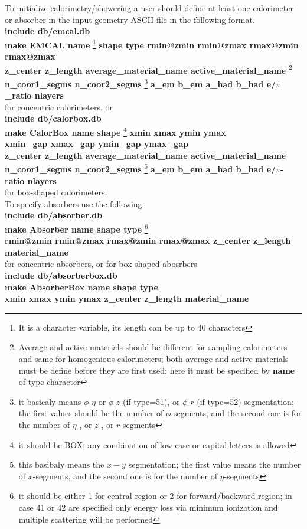 \par
To initialize calorimetry/showering a user should define at least one 
calorimeter or absorber in the input geometry ASCII file in the following 
format. \\
{\bf include db/emcal.db} \\
{\bf make EMCAL name} \footnote{It is a character variable, its length
can be up to 40 characters}
{\bf shape type rmin@zmin rmin@zmax rmax@zmin rmax@zmax} \\
{\bf z\_center z\_length average\_material\_name active\_material\_name} 
\footnote{Average and active materials should be different for sampling
calorimeters and same for homogenious calorimeters; both average and active
materials must be define before they are first used; here it must be 
specified by {\bf name} of type character}  
\\
{\bf n\_coor1\_segms n\_coor2\_segms} \footnote{it basicaly means $\phi$-$\eta$
or $\phi$-$z$ (if type=51), or $\phi$-$r$ (if type=52) segmentation; 
the first values should be the number of $\phi$-segments, and the
second one is for the number of $\eta$-, or $z$-, or $r$-segments} 
{\bf a\_em b\_em a\_had b\_had e/$\pi$\_ratio nlayers} \\
for concentric calorimeters, or \\
{\bf include db/calorbox.db} \\
{\bf make CalorBox name shape} \footnote{it should be BOX; any combination of
low case or capital letters is allowed}  
{\bf xmin xmax ymin ymax } \\
{\bf xmin\_gap xmax\_gap ymin\_gap ymax\_gap } \\
{\bf z\_center z\_length average\_material\_name active\_material\_name } \\
{\bf n\_coor1\_segms n\_coor2\_segms} \footnote{this basibaly means the $x-y$ 
segmentation; the first value means the number of $x$-segments, and the second one
is for the number of $y$-segments}
{\bf a\_em b\_em a\_had b\_had e/$\pi$-ratio nlayers} \\
for box-shaped calorimeters. \\
To specify absorbers use the following. \\
{\bf include db/absorber.db } \\
{\bf make Absorber name shape type} \footnote{it should be either 1 for central
region or 2 for forward/backward region; in case 41 or 42 are specified only
energy loss via minimum ionization and multiple scattering will be performed} \\
{\bf rmin@zmin rmin@zmax rmax@zmin rmax@zmax z\_center z\_length material\_name} 
\\
for concentric absorbers,  
or for box-shaped abosrbers \\
{\bf include db/absorberbox.db } \\
{\bf make AbsorberBox name shape type} \\
{\bf xmin xmax ymin ymax z\_center z\_length material\_name} 

